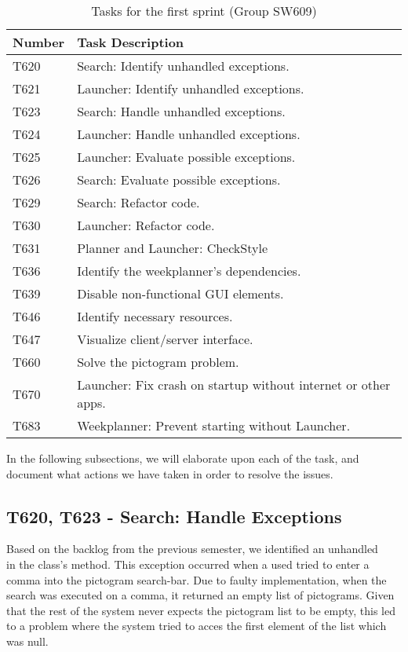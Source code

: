 \begin{table}[H]
\centering
\begin{tabular}{|l|l|}
\hline
Number 			& Task Description 												\\\hline
T620  			& Search: Identify unhandled exceptions.                 		\\\hline
T621    	   	& Launcher: Identify unhandled exceptions. 						\\\hline 
T623	       	& Search: Handle unhandled exceptions.                 			\\\hline
T624    	   	& Launcher: Handle unhandled exceptions.  						\\\hline
T625   	   		& Launcher: Evaluate possible exceptions.        				\\\hline
T626   	   		& Search: Evaluate possible exceptions.                			\\\hline
T629  	   		& Search: Refactor code.			   							\\\hline
T630       		& Launcher: Refactor code.                 						\\\hline
T631       		& Planner and Launcher: CheckStyle                 				\\\hline
T636			& Identify the weekplanner's dependencies.						\\\hline
T639       		& Disable non-functional GUI elements.               			\\\hline
T646       		& Identify necessary resources.                 				\\\hline 
T647       		& Visualize client/server interface.                 			\\\hline 
T660       		& Solve the pictogram problem.                 					\\\hline
T670       		& Launcher: Fix crash on startup without internet or other apps.\\\hline 
T683			& Weekplanner: Prevent starting without Launcher.				\\\hline
\end{tabular}
\caption{Tasks for the first sprint (Group SW609)} 
\label{SprintOneTasks}    
\end{table} 

In the following subsections, we will elaborate upon each of the task, and
document what actions we have taken in order to resolve the issues.

\subsection{T620, T623 - Search: Handle Exceptions}
Based on the backlog from the previous semester, we identified an unhandled
\\ in the  class's
 method. This exception occurred when a used tried to enter a
comma into the pictogram search-bar. Due to faulty implementation, when the
search was executed on a comma, it returned an empty list of pictograms. Given
that the rest of the system never expects the pictogram list to be empty, this
led to a problem where the system tried to acces the first element of the list
which was null.\nl

